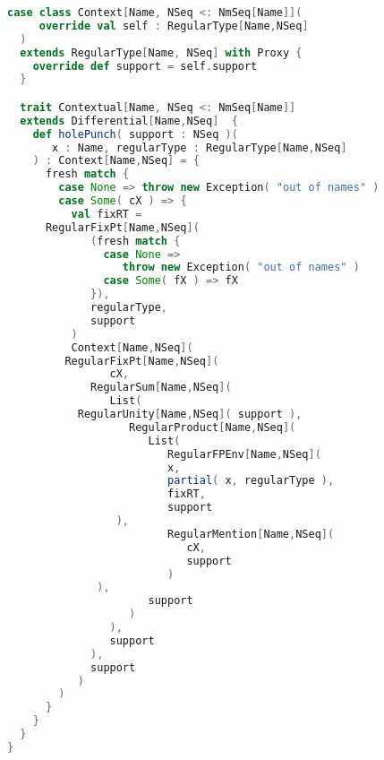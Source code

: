 \begin{lstlisting}[language=Scala]
  case class Context[Name, NSeq <: NmSeq[Name]](
     override val self : RegularType[Name,NSeq]
  )
  extends RegularType[Name, NSeq] with Proxy {
    override def support = self.support
  }

  trait Contextual[Name, NSeq <: NmSeq[Name]]
  extends Differential[Name,NSeq]  {
    def holePunch( support : NSeq )(
       x : Name, regularType : RegularType[Name,NSeq]
    ) : Context[Name,NSeq] = {
      fresh match {
        case None => throw new Exception( "out of names" )
        case Some( cX ) => {
          val fixRT =
	  RegularFixPt[Name,NSeq](
             (fresh match {
               case None =>
                  throw new Exception( "out of names" )
               case Some( fX ) => fX
             }),
             regularType,
             support
          )
          Context[Name,NSeq](
	     RegularFixPt[Name,NSeq](
                cX,
             RegularSum[Name,NSeq](
                List(
		   RegularUnity[Name,NSeq]( support ),
                   RegularProduct[Name,NSeq](
                      List(
                         RegularFPEnv[Name,NSeq](
                         x,
                         partial( x, regularType ),
                         fixRT,
                         support
		         ),
                         RegularMention[Name,NSeq](
                            cX,
                            support
                         )
		      ),
                      support
                   )
                ),
                support
             ),
             support
           )
        )
      }
    }
  }
}
\end{lstlisting}

